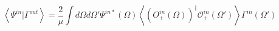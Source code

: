 \begin{equation}\label{CFTscalar}
\left<\Psi^{in}|
\Gamma^{out}\right>=
\frac{2}{\mu}\int d\Omega d\Omega'
\Psi^{in*}(\Omega)\left<(O_{+}^{in}(\Omega))^{\dag}
\mathcal{O}_+^{in}(\Omega')\right>
\Gamma^{in}(\Omega')
\end{equation}

